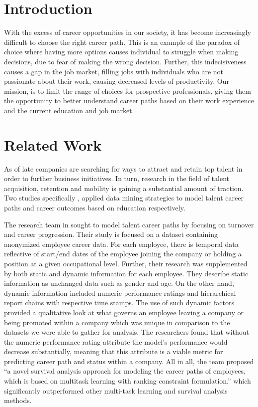 \section{Introduction}
With the excess of career opportunities in our society, it has become increasingly difficult to choose the right career path. This is an example of  the paradox of choice where having more options causes individual to struggle when making decisions, due to fear of making the wrong decision. Further, this indecisiveness causes a gap in the job market, filling jobs with individuals who are not passionate about their work, causing decreased levels of productivity. Our mission, is to limit the range of choices for prospective professionals, giving them the opportunity to better understand career paths based on their work experience and the current education and job market. 

\section{Related Work}
As of late companies are searching for ways to attract and retain top talent in order to further business initiatives. In turn,  research in the field of talent acquisition, retention and mobility is gaining a substantial amount of traction. Two studies specifically \cite{li2017, kapur2016}, applied data mining strategies to model talent career paths and career outcomes based on education respectively. 

The research team in \cite{li2017} sought to model talent career paths by focusing on turnover and career progression. Their study is focused on a dataset containing anonymized employee career data. For each employee, there is temporal data reflective of start/end dates of the employee joining the company or holding a position at a given occupational level. Further, their research was supplemented by both static and dynamic information for each employee. They describe static information as unchanged data such as gender and age. On the other hand, dynamic information included numeric performance ratings and hierarchical report chains with respective time stamps. The use of such dynamic factors provided a qualitative look at what governs an employee leaving a company or being promoted within a company which was unique in comparison to the datasets we were able to gather for analysis. The researchers found that without the numeric performance rating attribute the model’s performance would decrease substantially, meaning that this attribute is a viable metric for predicting career path and status within a company.  All in all, the team proposed “a novel survival analysis approach for modeling the career paths of employees, which is based on multitask learning with ranking constraint formulation.”\cite{li2017} which significantly outperformed other multi-task learning and survival analysis methods. 

